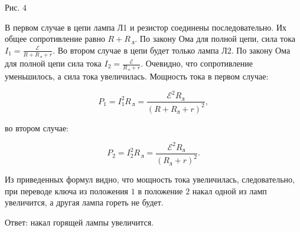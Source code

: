 \documentclass[12pt,a4paper]{article}
\begin{document}
{\begin{center}\end{center}

Рис. $4$ 

В первом случае в цепи лампа Л1 и резистор соединены последовательно. Их общее сопротивление равно $R + R_{\,\text{л}}.$ По закону Ома для полной цепи, сила тока $I_1= \frac{\mathcal{E}}{R + R_{\,\text{л}} + r} .$
Во втором случае в цепи будет только лампа Л2. По закону Ома для полной цепи сила тока $I_2= \frac{\mathcal{E}}{R_{\,\text{л}} + r} .$ Очевидно, что сопротивление уменьшилось, а сила тока увеличилась. Мощность тока в первом случае:

\[P_1=I_1 ^2 R_{\,\text{л}}= \frac{\mathcal E^2 R_{\text{л}}}{(R+R_{\text{л}}+r)^2} ,\]

во втором случае:

\[P_2=I_2 ^2 R_{\,\text{л}}= \frac{\mathcal E^2 R_{\text{л}}}{(R_{\text{л}}+r)^2} .\]

Из приведенных формул видно, что мощность тока увеличилась, следовательно, при переводе ключа из положения $1$ в положение $2$ накал одной из ламп увеличится, а другая лампа гореть не будет.

Ответ: накал горящей лампы увеличится.
}
\end{document}
